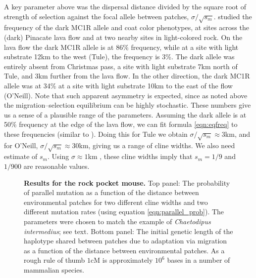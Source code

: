 \documentclass[10pt,letterpaper]{article}
\newcommand{\citep}[1]{\cite{#1}}
\newcommand{\citet}[1]{\cite{#1}}
\begin{document}
A key parameter above was the dispersal distance divided by the square root of strength of selection against the focal allele between patches, $\sigma/\sqrt{s_m}$. 
\citet{hoekstra2004ecological} studied the frequency of the dark MC1R allele and coat color phenotypes, 
at sites across the (dark) Pinacate lava flow and at two nearby sites in light-colored rock.
On the lava flow the dark MC1R allele is at 86\% frequency,
while at a site with light substrate 12km to the west (Tule), the frequency is 3\%.
The dark allele was entirely absent from Christmas pass, a site with light substrate 7km north of Tule, and 3km further from the lava flow.
In the other direction, the dark MC1R allele was at 34\% at a site with light substrate 10km to the east of the flow (O'Neill).
Note that such apparent asymmetry is expected,
since as noted above the migration--selection equilibrium can be highly stochastic.
These numbers give us a sense of a plausible range of the parameters.
Assuming the dark allele is at 50\% frequency at the edge of the lava flow, 
we can fit formula \eqref{eqn:eqfreq} to these frequencies
(similar to \citet{hoekstra2004ecological}).
Doing this for Tule we obtain $\sigma/\sqrt{s_m} \approx 3$km, 
and for O'Neill, $\sigma/\sqrt{s_m} \approx 30$km, giving us a range of cline widths. 
We also need estimate of $s_m$. 
Using $\sigma \approx 1$km \citep{french1968dispersal,allred1963range}, 
these cline widths imply that $s_m=1/9$ and $1/900$ are reasonable values.

\begin{figure}[ht]
  \begin{center}
  \end{center}
  \caption{
      \textbf{Results for the rock pocket mouse.}
Top panel: The probability of parallel mutation as a function of the distance
between environmental patches for two different cline widths
and two different mutation rates (using equation \eqref{eqn:parallel_prob}). 
The parameters were chosen to match the example of \textit{Chaetodipus intermedius};
see text. Bottom panel: The initial genetic length of the haplotype
shared between patches due to adaptation via migration as a function
of the distance between environmental patches. As a rough rule of
thumb $1$cM is approximately $10^6$ bases in a number of mammalian species. 
  \label{fig:mice_prob_parallel}
  }
\end{figure}
\end{document}
